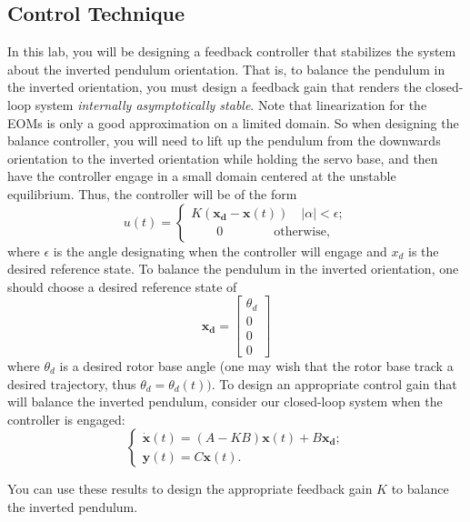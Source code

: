 \subsection{Control Technique}
In this lab, you will be designing a feedback controller that stabilizes the system about the inverted pendulum orientation. That is, to balance the pendulum in the inverted orientation, you must design a feedback gain that renders the closed-loop system \emph{internally asymptotically stable}. Note that linearization for the EOMs is only a good approximation on a limited domain. So when designing the balance controller, you will need to lift up the pendulum from the downwards orientation to the inverted orientation while holding the servo base, and then have the controller engage in a small domain centered at the unstable equilibrium. Thus, the controller will be of the form
\[ u(t) =
    \begin{cases}
        K(\mathbf{x_d} - \mathbf{x}(t)) \quad |\alpha| < \epsilon; \\
        \quad \quad 0 \quad \quad \quad \quad \text{otherwise},
    \end{cases}
\]
where $\epsilon$ is the angle designating when the controller will engage and $x_d$ is the desired reference state. To balance the pendulum in the inverted orientation, one should choose a desired reference state of
\[
    \mathbf{x_d} =
    \left[\begin{array}{c}
            \theta_d \\
            0        \\
            0        \\
            0
        \end{array}\right]
\]
where $\theta_d$ is a desired rotor base angle (one may wish that the rotor base track a desired trajectory, thus $\theta_d=\theta_d(t))$. To design an appropriate control gain that will balance the inverted pendulum, consider our closed-loop system when the controller is engaged:
\begin{equation}
    \begin{cases}
        \mathbf{\dot{x}}(t) = \left(A-KB\right)\mathbf{x}(t) + B\mathbf{x_d}; \\
        \mathbf{y}(t) = C\mathbf{x}(t).
    \end{cases}
    \label{equation:lab3_feedback}
\end{equation}

You can use these results to design the appropriate feedback gain $K$ to balance the inverted pendulum.

